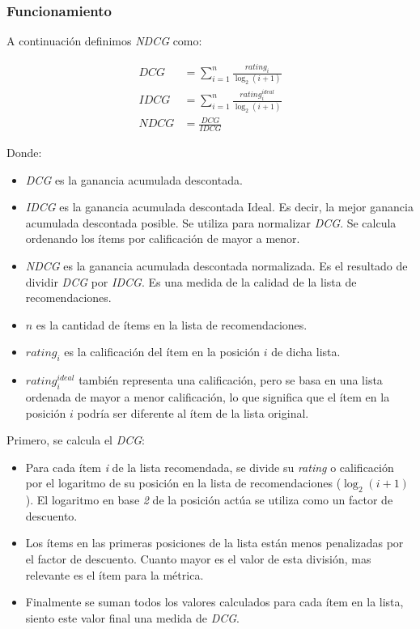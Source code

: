 \documentclass[11pt,a4paper,twoside]{thesis}
\begin{document}
\subsubsection{Funcionamiento}

A continuación definimos \textit{NDCG} como:

\begin{equation}
	\begin{split}
		DCG  & = \sum_{i=1}^{n} \frac{rating_i}{\log_2(i + 1)}         \\
		IDCG & = \sum_{i=1}^{n} \frac{rating_i^{ideal}}{\log_2(i + 1)} \\
		NDCG & = \frac{DCG}{IDCG}
	\end{split}
\end{equation}

Donde:
\begin{itemize}
	\item \textit{DCG} es la ganancia acumulada descontada.
	\item \textit{IDCG} es la ganancia acumulada descontada Ideal. Es decir, la mejor ganancia acumulada descontada posible. Se utiliza para normalizar \textit{DCG}. Se calcula ordenando los ítems por calificación de mayor a menor.
	\item \textit{NDCG} es la ganancia acumulada descontada normalizada. Es el resultado de dividir \textit{DCG} por \textit{IDCG}. Es una medida de la calidad de la lista de recomendaciones.
	\item $n$ es la cantidad de ítems en la lista de recomendaciones.
	\item $rating_i$ es la calificación del ítem en la posición $i$ de dicha lista.
	\item $rating_i^{ideal}$ también representa una calificación, pero se basa en una lista ordenada de mayor a menor calificación, lo que significa que el ítem en la posición $i$ podría ser diferente al ítem de la lista original.
\end{itemize}

Primero, se calcula el \textit{DCG}:

\begin{itemize}
	\item Para cada ítem \textit{i} de la lista recomendada, se divide su \textit{rating} o calificación por el logaritmo de su posición en la lista de recomendaciones ($\log_2(i + 1)$). El logaritmo en base \textit{2} de la posición actúa se utiliza como un factor de descuento.
	\item Los ítems en las primeras posiciones de la lista están menos penalizadas por el factor de descuento. Cuanto mayor es el valor de esta división, mas relevante es el ítem para la métrica.
	\item Finalmente se suman todos los valores calculados para cada ítem en la lista, siento este valor final una medida de \textit{DCG}.
\end{itemize}
\end{document}
